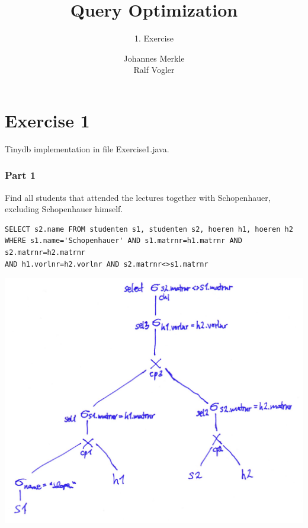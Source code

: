 \documentclass[11pt,a4paper]{scrartcl}
\begin{document}
\author{Johannes Merkle\\Ralf Vogler}
\title{Query Optimization}
\subtitle{1. Exercise}

\maketitle

\section*{Exercise 1}
Tinydb implementation in file Exercise1.java.
\subsubsection*{Part 1}
Find all students that attended the lectures together with Schopenhauer, excluding
Schopenhauer himself.
\begin{verbatim}
SELECT s2.name FROM studenten s1, studenten s2, hoeren h1, hoeren h2
WHERE s1.name='Schopenhauer' AND s1.matrnr=h1.matrnr AND s2.matrnr=h2.matrnr
AND h1.vorlnr=h2.vorlnr AND s2.matrnr<>s1.matrnr
\end{verbatim}
\includegraphics[scale=.17]{part1.jpg}
\end{document}
